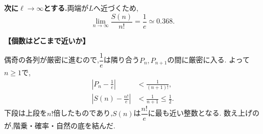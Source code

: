 \begin{enumerate}[label=\textbf{問\arabic*.},leftmargin=3.8em,format=\bookitemlink{practice-entrance}{solution}{problem}]
                  \textbf{次に$\ell\to\infty$とする.}両端が$L$へ近づくため,
                  \[
                    \boxed{\lim_{n\to\infty}\frac{S(n)}{n!}=\frac1e\simeq0.368}.
                  \]
                  \par\smallskip\noindent\textbf{【個数はどこまで近いか】}\par\nopagebreak[4]
                  偶奇の各列が厳密に進むので,$\dfrac{1}{e}$は隣り合う$P_n,P_{n+1}$の間に厳密に入る.
                  よって$n\ge1$で,
                  \[
                  \begin{aligned}
                    \left|P_n-\frac1e\right|&<\frac1{(n+1)!},\\
                    \left|S(n)-\frac{n!}e\right|&<\frac1{n+1}\le\frac12.
                  \end{aligned}
                  \]
                  下段は上段を$n!$倍したものであり,$S(n)$は$\dfrac{n!}{e}$に最も近い整数となる.
                  数え上げのが,階乗・確率・自然の底を結んだ.
        \end{enumerate}
